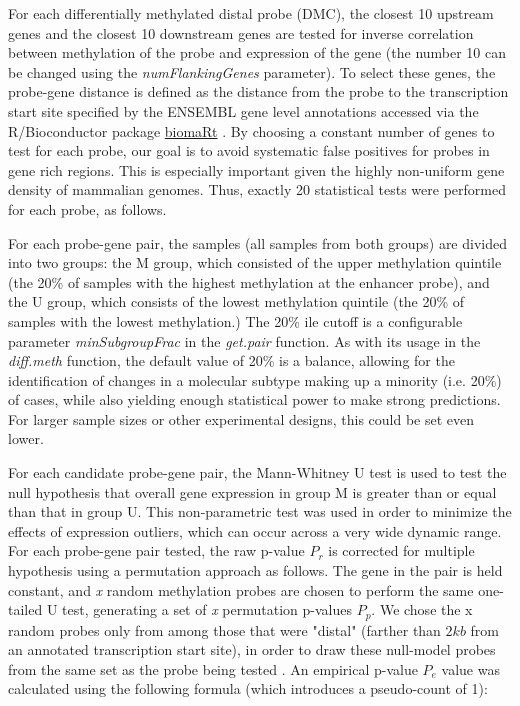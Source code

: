 For each differentially methylated distal probe (DMC), the closest 10 upstream 
genes and the closest 10 downstream genes are tested for inverse correlation between 
methylation of the probe and expression of the gene (the number 10 can be changed using the \textit{numFlankingGenes} parameter). To select these genes, 
the probe-gene distance is defined as the distance from the probe to the transcription 
start site specified by the ENSEMBL gene level annotations \cite{yates2015ensembl} accessed via
the R/Bioconductor package \href{http://bioconductor.org/packages/biomaRt/}{biomaRt} \cite{durinck2009mapping,durinck2005biomart}. By choosing a constant number of genes to test for each probe, our goal is to avoid systematic false positives for probes in gene rich regions. This is especially important given the highly non-uniform gene density of mammalian genomes.
Thus, exactly 20 statistical tests were performed for each probe, as follows. 

For each probe-gene pair, the samples (all samples from both groups) are divided into two 
groups: the M group, which consisted of the upper methylation quintile (the 20\%
of samples with the highest methylation at the enhancer probe), and the U group, 
which consists of the lowest methylation quintile (the 20\% of samples with the 
lowest methylation.) The 20\% ile cutoff is a configurable parameter \textit{minSubgroupFrac} in the \textit{get.pair} function.
As with its usage in the \textit{diff.meth} function, the default value of 20\% is a balance, allowing for the identification of changes in a 
molecular subtype making up a minority (i.e. 20\%) of cases, while also yielding 
enough statistical power to make strong predictions. For larger sample sizes or other experimental designs, this could be set even lower.

For each candidate probe-gene pair, 
the Mann-Whitney U test is used to test the null hypothesis that overall gene 
expression in group M is greater than or equal than that in group U. 
This non-parametric test was used in order to minimize the effects 
of expression outliers, which can  occur across a very wide dynamic range. 
For each probe-gene pair tested, the raw p-value $P_r$ is corrected for multiple 
hypothesis using a permutation approach as follows.
The gene in the pair is held constant, and \textit{x} random methylation probes are 
chosen to perform the same one-tailed U test, generating a set of \textit{x} permutation
p-values $P_p$. We chose the x random probes only from among those that were 
"distal" (farther than $2kb$ from an annotated transcription start site), in order 
to draw these null-model probes from the same set as the probe being tested \cite{sham2014statistical}. 
An empirical p-value $P_e$ value was calculated using the following formula 
(which introduces a pseudo-count of 1):

